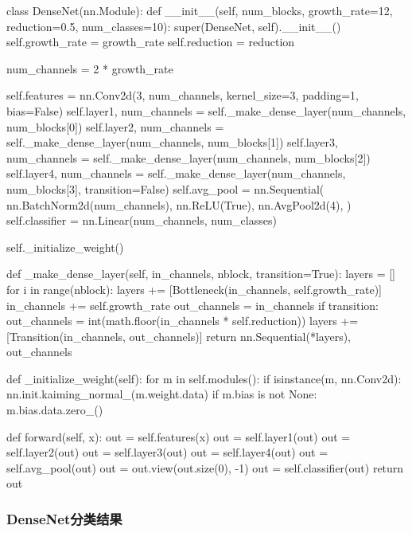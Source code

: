 \documentclass[UTF8,a4paper,10pt]{ctexart}
\begin{document}
\begin{python}
class DenseNet(nn.Module):
    def __init__(self, num_blocks, growth_rate=12, reduction=0.5, num_classes=10):
        super(DenseNet, self).__init__()
        self.growth_rate = growth_rate
        self.reduction = reduction
        
        num_channels = 2 * growth_rate
        
        self.features = nn.Conv2d(3, num_channels, kernel_size=3, padding=1, bias=False)
        self.layer1, num_channels = self._make_dense_layer(num_channels, num_blocks[0])
        self.layer2, num_channels = self._make_dense_layer(num_channels, num_blocks[1])
        self.layer3, num_channels = self._make_dense_layer(num_channels, num_blocks[2])
        self.layer4, num_channels = self._make_dense_layer(num_channels, num_blocks[3], transition=False)
        self.avg_pool = nn.Sequential(
            nn.BatchNorm2d(num_channels),
            nn.ReLU(True),
            nn.AvgPool2d(4),
        )
        self.classifier = nn.Linear(num_channels, num_classes)
        
        self._initialize_weight()
        
    def _make_dense_layer(self, in_channels, nblock, transition=True):
        layers = []
        for i in range(nblock):
            layers += [Bottleneck(in_channels, self.growth_rate)]
            in_channels += self.growth_rate
        out_channels = in_channels
        if transition:
            out_channels = int(math.floor(in_channels * self.reduction))
            layers += [Transition(in_channels, out_channels)]
        return nn.Sequential(*layers), out_channels
    
    def _initialize_weight(self):
        for m in self.modules():
            if isinstance(m, nn.Conv2d):
                nn.init.kaiming_normal_(m.weight.data)
                if m.bias is not None:
                    m.bias.data.zero_()
    
    def forward(self, x):
        out = self.features(x)
        out = self.layer1(out)
        out = self.layer2(out)
        out = self.layer3(out)
        out = self.layer4(out)
        out = self.avg_pool(out)
        out = out.view(out.size(0), -1)
        out = self.classifier(out)
        return out
\end{python}

\subsubsection{DenseNet分类结果}
\end{document}
